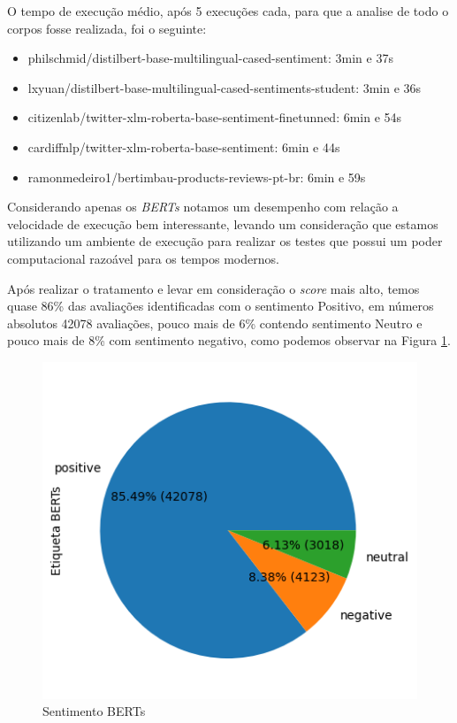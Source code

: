 O tempo de execução médio, após 5 execuções cada, para que a analise de todo o corpos fosse realizada, foi o seguinte:

\begin{itemize}
	\item philschmid/distilbert-base-multilingual-cased-sentiment: 3min e 37s
	\item lxyuan/distilbert-base-multilingual-cased-sentiments-student: 3min e 36s
	\item citizenlab/twitter-xlm-roberta-base-sentiment-finetunned: 6min e 54s
	\item cardiffnlp/twitter-xlm-roberta-base-sentiment: 6min e 44s
	\item ramonmedeiro1/bertimbau-products-reviews-pt-br: 6min e 59s
\end{itemize}

Considerando apenas os \textit{BERTs} notamos um desempenho com relação a velocidade de execução bem interessante, levando um consideração que estamos utilizando um ambiente de execução para realizar os testes que possui um poder computacional razoável para os tempos modernos.

Após realizar o tratamento e levar em consideração o \textit{score} mais alto, temos quase 86\% das avaliações identificadas com o sentimento Positivo, em números absolutos 42078 avaliações, pouco mais de 6\% contendo sentimento Neutro e pouco mais de 8\% com sentimento negativo, como podemos observar na Figura \ref{img:sentimento_bert}.

\begin{figure}
	\centering
	\includegraphics[width=.7\textwidth]{figs/bert/distribuicao_pizza.png}
	\caption{Sentimento BERTs}
	\label{img:sentimento_bert}
\end{figure}

